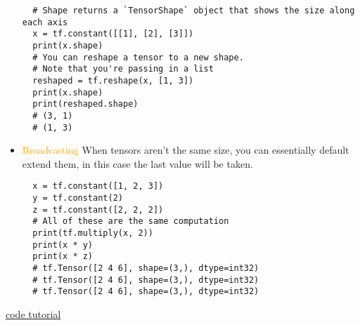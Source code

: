\documentclass[main.tex,fontsize=8pt,paper=a4,paper=portrait,DIV=calc,]{scrartcl}
\begin{document}
\begin{itemize}
\begin{lstlisting}
  # Shape returns a `TensorShape` object that shows the size along each axis
  x = tf.constant([[1], [2], [3]])
  print(x.shape)
  # You can reshape a tensor to a new shape.
  # Note that you're passing in a list
  reshaped = tf.reshape(x, [1, 3])
  print(x.shape)
  print(reshaped.shape)
  # (3, 1)
  # (1, 3)
  \end{lstlisting}
\item \textcolor{orange}{Broadcasting}\newline
  When tensors aren't the same size, you can essentially default extend them, in this case the last value will be taken.
  \begin{lstlisting}
  x = tf.constant([1, 2, 3])
  y = tf.constant(2)
  z = tf.constant([2, 2, 2])
  # All of these are the same computation
  print(tf.multiply(x, 2))
  print(x * y)
  print(x * z)
  # tf.Tensor([2 4 6], shape=(3,), dtype=int32)
  # tf.Tensor([2 4 6], shape=(3,), dtype=int32)
  # tf.Tensor([2 4 6], shape=(3,), dtype=int32)
  \end{lstlisting}
\end{itemize} 
\href{https://www.tensorflow.org/guide/tensor}{code tutorial}
\end{document}
